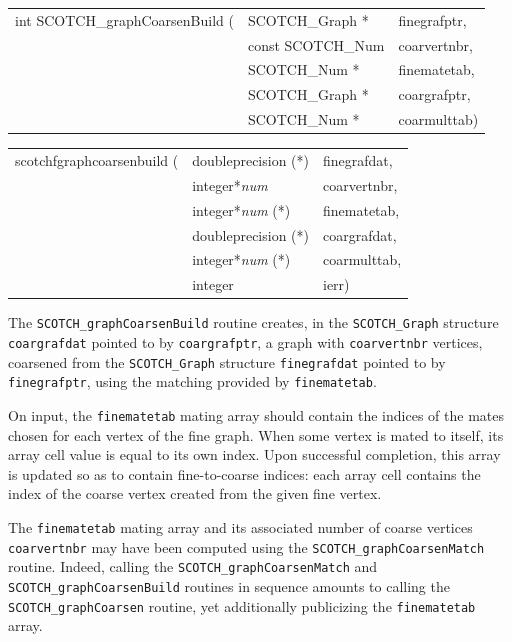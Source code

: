 \begin{itemize}
\progsyn

{\tt\begin{tabular}{l@{}ll}
int SCOTCH\_graphCoarsenBuild ( & SCOTCH\_Graph *   & finegrafptr, \\
                                & const SCOTCH\_Num & coarvertnbr, \\
                                & SCOTCH\_Num *     & finematetab, \\
                                & SCOTCH\_Graph *   & coargrafptr, \\
                                & SCOTCH\_Num *     & coarmulttab) \\
\end{tabular}}

{\tt\begin{tabular}{l@{}ll}
scotchfgraphcoarsenbuild ( & doubleprecision (*)   & finegrafdat, \\
                           & integer*{\it num}     & coarvertnbr, \\
                           & integer*{\it num} (*) & finematetab, \\
                           & doubleprecision (*)   & coargrafdat, \\
                           & integer*{\it num} (*) & coarmulttab, \\
                           & integer               & ierr)
\end{tabular}}

\progdes

The {\tt SCOTCH\_graphCoarsenBuild} routine creates, in the
{\tt SCOTCH\_\lbt Graph} structure {\tt coar\lbt graf\lbt dat} pointed
to by {\tt coar\lbt graf\lbt ptr}, a graph with {\tt coar\lbt vert\lbt nbr}
vertices, coarsened from the {\tt SCOTCH\_\lbt Graph} structure
{\tt fine\lbt graf\lbt dat} pointed to by {\tt fine\lbt graf\lbt ptr},
using the matching provided by {\tt fine\lbt mate\lbt tab}.

On input, the {\tt fine\lbt mate\lbt tab} mating array should contain
the indices of the mates chosen for each vertex of the fine
graph. When some vertex is mated to itself, its array cell value is
equal to its own index. Upon successful completion, this array is
updated so as to contain fine-to-coarse indices: each array cell
contains the index of the coarse vertex created from the given fine
vertex.

The {\tt fine\lbt mate\lbt tab} mating array and its associated number
of coarse vertices {\tt coar\lbt vert\lbt nbr} may have been computed
using the {\tt SCOTCH\_\lbt graph\lbt Coarsen\lbt Match}
routine. Indeed, calling the
{\tt SCOTCH\_\lbt graph\lbt Coarsen\lbt Match} and
{\tt SCOTCH\_\lbt graph\lbt Coarsen\lbt Build} routines in sequence
amounts to calling the {\tt SCOTCH\_\lbt graph\lbt Coarsen} routine,
yet additionally publicizing the {\tt fine\lbt mate\lbt tab} array.


\end{itemize}
